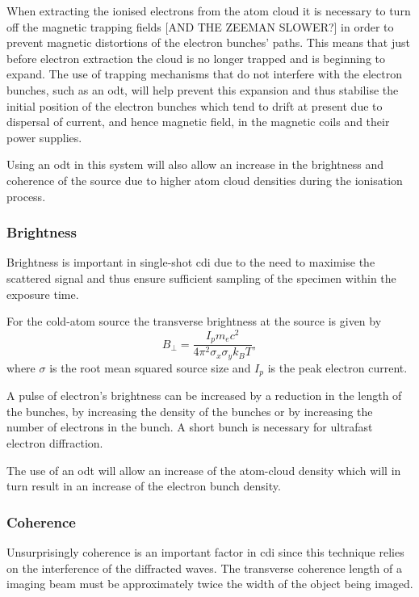 When extracting the ionised electrons from the atom cloud it is necessary to turn off the magnetic trapping fields [AND THE ZEEMAN SLOWER?] in order to prevent magnetic distortions of the electron bunches' paths. This means that just before electron extraction the cloud is no longer trapped and is beginning to expand. The use of trapping mechanisms that do not interfere with the electron bunches, such as an \gls{odt}, will help prevent this expansion and thus stabilise the initial position of the electron bunches which tend to drift at present due to dispersal of current, and hence magnetic field, in the magnetic coils and their power supplies.

Using an \gls{odt} in this system will also allow an increase in the brightness and coherence of the source due to higher atom cloud densities during the ionisation process.

\subsubsection{Brightness}
Brightness is important in single-shot \gls{cdi} due to the need to maximise the scattered signal and thus ensure sufficient sampling of the specimen within the exposure time.

For the cold-atom source the transverse brightness at the source is given by\cite{reiser_theory_2008}
\begin{equation}
B_\perp = \frac{I_p m_e c^2}{4 \pi^2 \sigma_x \sigma_y k_B T},
\end{equation}
where $\sigma$ is the root mean squared source size and $I_p$ is the peak electron current.

A pulse of electron's brightness can be increased by a reduction in the length of the bunches, by increasing the density of the bunches or by increasing the number of electrons in the bunch. A short bunch is necessary for ultrafast electron diffraction.

The use of an \gls{odt} will allow an increase of the atom-cloud density which will in turn result in an increase of the electron bunch density.

\subsubsection{Coherence}
Unsurprisingly coherence is an important factor in \gls{cdi} since this technique relies on the interference of the diffracted waves. The transverse coherence length of a imaging beam must be approximately twice the width of the object being imaged\cite{spence_coherence_2004}.

